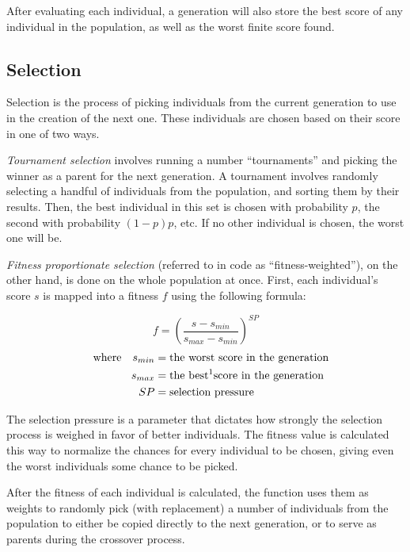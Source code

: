 \documentclass{report}
\begin{document}
After evaluating each individual, a generation will also store the best score of any individual in the population, as well as the worst finite score found.

\subsection{Selection}

Selection is the process of picking individuals from the current generation to use in the creation of the next one. These individuals are chosen based on their score in one of two ways.

\emph{Tournament selection} involves running a number ``tournaments'' and picking the winner as a parent for the next generation. A tournament involves randomly selecting a handful of individuals from the population, and sorting them by their results. Then, the best individual in this set is chosen with probability \label{tournament_p}$p$, the second with probability $(1-p)p$, etc. If no other individual is chosen, the worst one will be.

\emph{Fitness proportionate selection} (referred to in code as ``fitness-weighted''), on the other hand, is done on the whole population at once. First, each individual's score $s$ is mapped into a fitness $f$ using the following formula:

$$f = \left(\frac{s - s_{min}}{s_{max} - s_{min}}\right)^{SP}$$
\begin{align*}\quad
    \text{where}\quad
    s_{min} &= \text{the worst score in the generation}\\
    s_{max} &= \text{the best\footnotemark score in the generation}\\
    SP &= \text{selection pressure}
\end{align*}


The selection pressure is a parameter that dictates how strongly the selection process is weighed in favor of better individuals. The fitness value is calculated this way to normalize the chances for every individual to be chosen, giving even the worst individuals some chance to be picked.

After the fitness of each individual is calculated, the function uses them as weights to randomly pick (with replacement) a number of individuals from the population to either be copied directly to the next generation, or to serve as parents during the crossover process.
\end{document}
